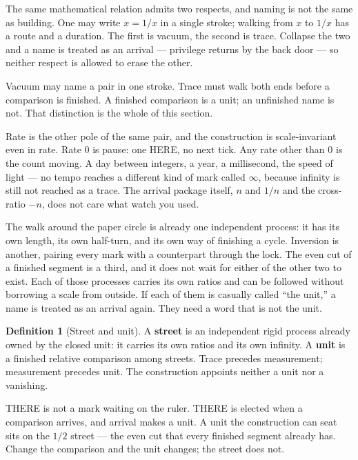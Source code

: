 \documentclass[10pt,a4paper]{article}
\theoremstyle{plain}
\theoremstyle{definition}
\newtheorem{definition}{Definition}
\theoremstyle{remark}
\begin{document}
The same mathematical relation admits two respects, and naming is not the same as building.
One may write \(x=1/x\) in a single stroke; walking from \(x\) to \(1/x\) has a route and a duration.
The first is vacuum, the second is trace.
Collapse the two and a name is treated as an arrival --- privilege returns by the back door --- so neither respect is allowed to erase the other.

Vacuum may name a pair in one stroke.
Trace must walk both ends before a comparison is finished.
A finished comparison is a unit; an unfinished name is not.
That distinction is the whole of this section.

Rate is the other pole of the same pair, and the construction is scale-invariant even in rate.
Rate \(0\) is pause: one HERE, no next tick.
Any rate other than \(0\) is the count moving.
A day between integers, a year, a millisecond, the speed of light --- no tempo reaches a different kind of mark called \(\infty\), because infinity is still not reached as a trace.
The arrival package itself, \(n\) and \(1/n\) and the cross-ratio \(-n\), does not care what watch you used.

The walk around the paper circle is already one independent process: it has its own length, its own half-turn, and its own way of finishing a cycle.
Inversion is another, pairing every mark with a counterpart through the lock.
The even cut of a finished segment is a third, and it does not wait for either of the other two to exist.
Each of those processes carries its own ratios and can be followed without borrowing a scale from outside.
If each of them is casually called ``the unit,'' a name is treated as an arrival again.
They need a word that is not the unit.

\begin{definition}[Street and unit]
A \textbf{street} is an independent rigid process already owned by the closed unit: it carries its own ratios and its own infinity.
A \textbf{unit} is a finished relative comparison among streets.
Trace precedes measurement; measurement precedes unit.
The construction appoints neither a unit nor a vanishing.
\end{definition}

THERE is not a mark waiting on the ruler.
THERE is elected when a comparison arrives, and arrival makes a unit.
A unit the construction can seat sits on the \(1/2\) street --- the even cut that every finished segment already has.
Change the comparison and the unit changes; the street does not.
\end{document}
